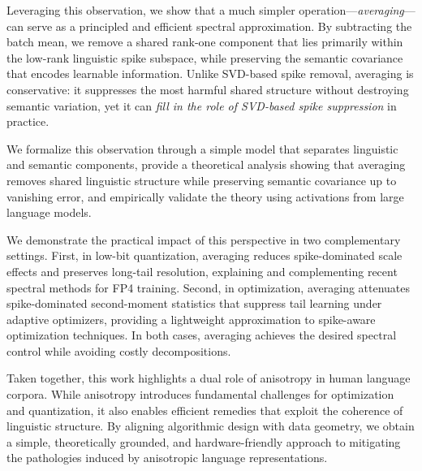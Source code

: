 {Leveraging this observation, we show that a much simpler operation---\emph{averaging}---can
serve as a principled and efficient spectral approximation.
By subtracting the batch mean, we remove a shared rank-one component that lies
primarily within the low-rank linguistic spike subspace, while preserving the
semantic covariance that encodes learnable information.
Unlike SVD-based spike removal, averaging is conservative: it suppresses the most
harmful shared structure without destroying semantic variation, yet it can
\emph{fill in the role of SVD-based spike suppression} in practice.

We formalize this observation through a simple model that separates linguistic
and semantic components, provide a theoretical analysis showing that averaging
removes shared linguistic structure while preserving semantic covariance up to
vanishing error, and empirically validate the theory using activations from large
language models.

We demonstrate the practical impact of this perspective in two complementary
settings.
First, in low-bit quantization, averaging reduces spike-dominated scale effects
and preserves long-tail resolution, explaining and complementing recent spectral
methods for FP4 training.
Second, in optimization, averaging attenuates spike-dominated second-moment
statistics that suppress tail learning under adaptive optimizers, providing a
lightweight approximation to spike-aware optimization techniques.
In both cases, averaging achieves the desired spectral control while avoiding
costly decompositions.

Taken together, this work highlights a dual role of anisotropy in human language
corpora.
While anisotropy introduces fundamental challenges for optimization and
quantization, it also enables efficient remedies that exploit the coherence of
linguistic structure.
By aligning algorithmic design with data geometry, we obtain a simple,
theoretically grounded, and hardware-friendly approach to mitigating the
pathologies induced by anisotropic language representations.

}
